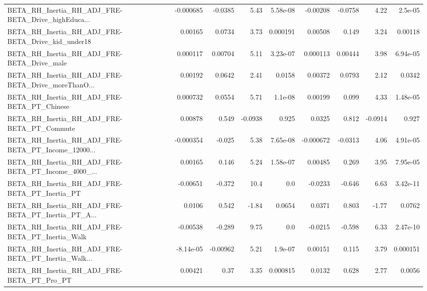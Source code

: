 \begin{tabular}{lrrrrrrrr}
BETA\_RH\_Inertia\_RH\_ADJ\_FRE-BETA\_Drive\_highEduca... &   -0.000685 &      -0.0385 &     5.43 & 5.58e-08 &   -0.00208 &     -0.0758 &         4.22 &       2.5e-05 \\
BETA\_RH\_Inertia\_RH\_ADJ\_FRE-BETA\_Drive\_kid\_under18  &     0.00165 &       0.0734 &     3.73 & 0.000191 &    0.00508 &       0.149 &         3.24 &       0.00118 \\
BETA\_RH\_Inertia\_RH\_ADJ\_FRE-BETA\_Drive\_male         &    0.000117 &      0.00704 &     5.11 & 3.23e-07 &   0.000113 &     0.00444 &         3.98 &      6.94e-05 \\
BETA\_RH\_Inertia\_RH\_ADJ\_FRE-BETA\_Drive\_moreThanO... &     0.00192 &       0.0642 &     2.41 &   0.0158 &    0.00372 &      0.0793 &         2.12 &        0.0342 \\
BETA\_RH\_Inertia\_RH\_ADJ\_FRE-BETA\_PT\_Chinese         &    0.000732 &       0.0554 &     5.71 &  1.1e-08 &    0.00199 &       0.099 &         4.33 &      1.48e-05 \\
BETA\_RH\_Inertia\_RH\_ADJ\_FRE-BETA\_PT\_Commute         &     0.00878 &        0.549 &  -0.0938 &    0.925 &     0.0325 &       0.812 &      -0.0914 &         0.927 \\
BETA\_RH\_Inertia\_RH\_ADJ\_FRE-BETA\_PT\_Income\_12000... &   -0.000354 &       -0.025 &     5.38 & 7.65e-08 &  -0.000672 &     -0.0313 &         4.06 &      4.91e-05 \\
BETA\_RH\_Inertia\_RH\_ADJ\_FRE-BETA\_PT\_Income\_4000\_... &     0.00165 &        0.146 &     5.24 & 1.58e-07 &    0.00485 &       0.269 &         3.95 &      7.95e-05 \\
BETA\_RH\_Inertia\_RH\_ADJ\_FRE-BETA\_PT\_Inertia\_PT      &    -0.00651 &       -0.372 &     10.4 &      0.0 &    -0.0233 &      -0.646 &         6.63 &      3.42e-11 \\
BETA\_RH\_Inertia\_RH\_ADJ\_FRE-BETA\_PT\_Inertia\_PT\_A... &      0.0106 &        0.542 &    -1.84 &   0.0654 &     0.0371 &       0.803 &        -1.77 &        0.0762 \\
BETA\_RH\_Inertia\_RH\_ADJ\_FRE-BETA\_PT\_Inertia\_Walk    &    -0.00538 &       -0.289 &     9.75 &      0.0 &    -0.0215 &      -0.598 &         6.33 &      2.47e-10 \\
BETA\_RH\_Inertia\_RH\_ADJ\_FRE-BETA\_PT\_Inertia\_Walk... &   -8.14e-05 &     -0.00962 &     5.21 &  1.9e-07 &    0.00151 &       0.115 &         3.79 &      0.000151 \\
BETA\_RH\_Inertia\_RH\_ADJ\_FRE-BETA\_PT\_Pro\_PT          &     0.00421 &         0.37 &     3.35 & 0.000815 &     0.0132 &       0.628 &         2.77 &        0.0056 \\

\end{tabular}
